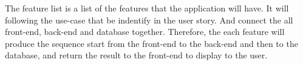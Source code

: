 The feature list is a list of the features that the application will have.
It will following the use-case that be indentify in the user story. And connect the all front-end, back-end and database together.
Therefore, the each feature will produce the sequence start from the front-end to the back-end and then to the database, 
and return the result to the front-end to display to the user.